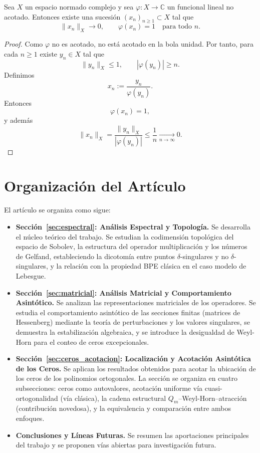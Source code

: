 \begin{lem}\label{lem:normalizacion_funcional_no_acotado}
	Sea $X$ un espacio normado complejo y sea $\varphi:X\to\mathbb C$ un funcional lineal no acotado.
	Entonces existe una sucesión $(x_n)_{n\ge1}\subset X$ tal que
	\[
		\|x_n\|_X\to 0,
		\qquad
		\varphi(x_n)=1
		\quad \text{para todo } n.
	\]
\end{lem}

\begin{proof}
	Como $\varphi$ no es acotado, no está acotado en la bola unidad. Por tanto, para cada
	$n\ge1$ existe $y_n\in X$ tal que
	\[
		\|y_n\|_X\le 1,
		\qquad
		|\varphi(y_n)|\ge n.
	\]
	Definimos
	\[
		x_n:=\frac{y_n}{\varphi(y_n)}.
	\]
	Entonces
	\[
		\varphi(x_n)=1,
	\]
	y además
	\[
		\|x_n\|_X
		=
		\frac{\|y_n\|_X}{|\varphi(y_n)|}
		\le
		\frac1n
		\xrightarrow[n\to\infty]{}0.
	\]
\end{proof}

\section{Organización del Artículo}

El artículo se organiza como sigue:

\begin{itemize}
	\item \textbf{Sección~\ref{sec:espectral}: Análisis Espectral y Topología.} Se desarrolla el núcleo teórico del trabajo. Se estudian la codimensión topológica del espacio de Sobolev, la estructura del operador multiplicación y los números de Gelfand, estableciendo la dicotomía entre puntos $\delta$-singulares y no $\delta$-singulares, y la relación con la propiedad BPE clásica en el caso modelo de Lebesgue.

	\item \textbf{Sección~\ref{sec:matricial}: Análisis Matricial y Comportamiento Asintótico.} Se analizan las representaciones matriciales de los operadores. Se estudia el comportamiento asintótico de las secciones finitas (matrices de Hessenberg) mediante la teoría de perturbaciones y los valores singulares, se demuestra la estabilización algebraica, y se introduce la desigualdad de Weyl-Horn para el conteo de ceros excepcionales.

	\item \textbf{Sección~\ref{sec:ceros_acotacion}: Localización y Acotación Asintótica de los Ceros.} Se aplican los resultados obtenidos para acotar la ubicación de los ceros de los polinomios ortogonales. La sección se organiza en cuatro subsecciones: ceros como autovalores, acotación uniforme vía cuasi-ortogonalidad (vía clásica), la cadena estructural $Q_m$--Weyl-Horn--atracción (contribución novedosa), y la equivalencia y comparación entre ambos enfoques.

	\item \textbf{Conclusiones y Líneas Futuras.} Se resumen las aportaciones principales del trabajo y se proponen vías abiertas para investigación futura.
\end{itemize}

